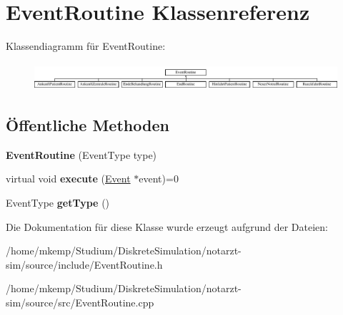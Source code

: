 \hypertarget{classEventRoutine}{}\section{Event\+Routine Klassenreferenz}
\label{classEventRoutine}
Klassendiagramm für Event\+Routine\+:\begin{figure}[H]
\begin{center}
\leavevmode
\includegraphics[height=1.012658cm]{classEventRoutine}
\end{center}
\end{figure}
\subsection*{Öffentliche Methoden}
\begin{DoxyCompactItemize}
\item 
{\bfseries Event\+Routine} (Event\+Type type)\hypertarget{classEventRoutine_acd33ef6e5acc459719005276cc9c55e9}{}\label{classEventRoutine_acd33ef6e5acc459719005276cc9c55e9}

\item 
virtual void {\bfseries execute} (\hyperlink{classEvent}{Event} $\ast$event)=0\hypertarget{classEventRoutine_aede9b0fdb576a4a262ced2d7d6548c14}{}\label{classEventRoutine_aede9b0fdb576a4a262ced2d7d6548c14}

\item 
Event\+Type {\bfseries get\+Type} ()\hypertarget{classEventRoutine_afcaf1409efcd2b6572b54c7a6fc02428}{}\label{classEventRoutine_afcaf1409efcd2b6572b54c7a6fc02428}

\end{DoxyCompactItemize}


Die Dokumentation für diese Klasse wurde erzeugt aufgrund der Dateien\+:\begin{DoxyCompactItemize}
\item 
/home/mkemp/\+Studium/\+Diskrete\+Simulation/notarzt-\/sim/source/include/Event\+Routine.\+h\item 
/home/mkemp/\+Studium/\+Diskrete\+Simulation/notarzt-\/sim/source/src/Event\+Routine.\+cpp\end{DoxyCompactItemize}
